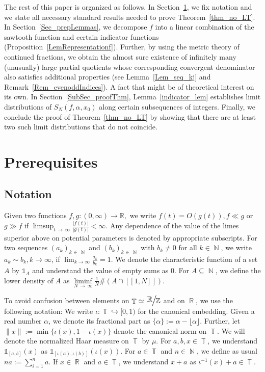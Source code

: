 \documentclass[AHL,Unicode,longabstracts,published]{cedram}
\DeclareMathOperator{\R}{\mathbb{R}}
\DeclareMathOperator{\N}{\mathbb{N}}
\DeclareMathOperator{\T}{\mathbb{T}}
\newcommand{\bbR}{\mathbb{R}}
\newcommand{\bbZ}{\mathbb{Z}}
\newcommand{\bbR}{\mathbb{R}}
\begin{document}
The rest of this paper is organized as follows. In Section~\ref{Sec_preReq}, we fix notation and we state all necessary standard results needed to prove Theorem~\ref{thm_no_LT}. In Section~\ref{Sec_prepLemmas}, we decompose $f$ into a linear combination of the sawtooth function and certain indicator functions (Proposition~\ref{LemRepresentationf}). Further, by using the metric theory of continued fractions, we obtain the almost sure existence of infinitely many (unusually) large partial quotients whose corresponding convergent denominator also satisfies additional properties (see Lemma~\ref{Lem_seq_kj} and Remark~\ref{Rem_evenoddIndices}). A fact that might be of theoretical interest on its own. In Section~\ref{SubSec_proofThm}, Lemma~\ref{indicator_lem} establishes limit distributions of $S_N(f, \alpha, x_0)$ along certain subsequences of integers. Finally, we conclude the proof of Theorem~\ref{thm_no_LT} by showing that there are at least two such limit distributions that do not coincide.



\section{Prerequisites}\label{Sec_preReq}

\subsection*{Notation}

Given two functions $f,g:(0,\infty)\to \bbR,$ we write $f(t) = O(g(t)), f \ll g$ or $g \gg f$ if $\limsup_{t\,\to\,\infty} \frac{|f(t)|}{|g(t)|} < \infty$. Any dependence of the value of the limes superior above on potential parameters is denoted by appropriate subscripts. For two sequences $ (a_k)_{k\,\in\,\N}$ and $(b_k)_{k \,\in\,\N}$ with $b_k \neq 0$ for all $k \in \N$, we write $a_k \sim b_k, k \to \infty$, if $ \lim_{k \to \infty} \frac{a_k}{b_k}=1$. We denote the characteristic function of a set $A$ by $\mathds{1}_A$ and understand the value of empty sums as $0$. For $A \subseteq \N$, we define the lower density of $A$ as $\liminf\limits_{N\,\to\,\infty}\frac{1}{N} \# (A \cap [\![1,N]\!])$.

\noindent To avoid confusion between elements on $\T \simeq {\Large{\sfrac{\R}{\bbZ}}}$ and on $\R$, we use the following notation: We write $\iota: \T \hookrightarrow [0,1)$ for the canonical embedding. Given a real number $\alpha$, we denote its fractional part as $\{ \alpha \} := \alpha - \lfloor \alpha \rfloor $. Further, let $\| x \| := \min\{\iota(x),1 - \iota(x)\}$ denote the canonical norm on $\T$. We will denote the normalized Haar measure on $\T$ by $\mu$. For $a,b,x \in \T$, we understand $ \mathds{1}_{[a,b]}(x) $ as $ \mathds{1}_{[\iota(a),\iota(b)]}(\iota(x))$. For $a \in \T$ and $n \in \N$, we define as usual $na :=\sum_{i=1}^n a$. If $x \in \R$ and $a \in \T$, we understand $x + a $ as $\iota^{-1}(x) + a \in \T $.
\end{document}
